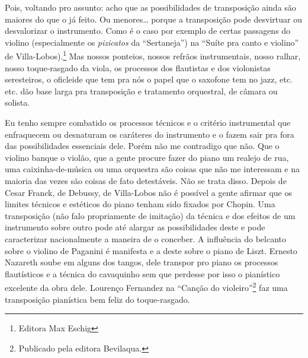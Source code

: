 Pois, voltando pro assunto: acho que as possibilidades de transposição
ainda são maiores do que o já feito. Ou menores\ldots{} porque a transposição
pode desvirtuar ou desvalorizar o instrumento. Como é o caso por exemplo
de certas passagens do violino (especialmente os \textit{pizicatos} da
``Sertaneja'') na ``Suíte pra canto e violino'' de Villa-Lobos).\footnote{Editora Max
Eschig} Mas nossos ponteios, nossos refrãos instrumentais, nosso
ralhar, nosso toque-rasgado da viola, os processos dos flautistas e dos
violonistas seresteiros, o oficleide que tem pra nós o papel que o
saxofone tem no jazz, etc. etc. dão base larga pra transposição e
tratamento orquestral, de câmara ou solista.

Eu tenho sempre combatido os processos técnicos e o critério
instrumental que enfraquecem ou desnaturam os caráteres do instrumento e
o fazem sair pra fora das possibilidades essenciais dele. Porém não me
contradigo que não. Que o violino banque o violão, que a gente procure
fazer do piano um realejo de rua, uma caixinha-de-música ou uma
orquestra são coisas que não me interessam e na maioria das vezes são
coisas de fato detestáveis. Não se trata disso. Depois de Cesar Franck,
de Debussy, de Villa-Lobos não é possível a gente afirmar que os limites
técnicos e estéticos do piano tenham sido fixados por Chopin. Uma
transposição (não falo propriamente de imitação) da técnica e dos
efeitos de um instrumento sobre outro pode até alargar as possibilidades
deste e pode caracterizar nacionalmente a maneira de o conceber. A
influência do belcanto sobre o violino de Paganini é manifesta e a deste
sobre o piano de Liszt. Ernesto Nazareth soube em alguns dos tangos,
dele transpor pro piano os processos flautísticos e a técnica do
cavaquinho sem que perdesse por isso o pianístico excelente da obra
dele. Lourenço Fernandez na ``Canção do violeiro''\footnote{Publicado pela editora Bevilaqua.} faz uma
transposição pianística bem feliz do toque-rasgado.

